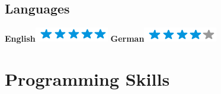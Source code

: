 \documentclass[]{friggeri-cv}
\begin{document}
\begin{aside}
    \section{Languages}
    \textbf{English}\includegraphics[scale=0.40]{img/5stars.png}
    \textbf{German}\includegraphics[scale=0.40]{img/4stars.png}
    ~
\end{aside}

\section{Programming Skills}
\end{document}
